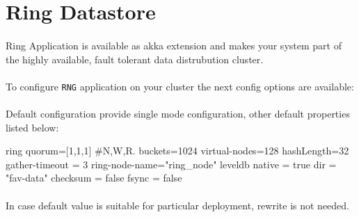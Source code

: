 \section{Ring Datastore}
\paragraph{}
Ring Application is available as akka extension and makes your system part of the highly available, fault tolerant data distrubution cluster.

\paragraph{}
To configure \texttt{RNG} application on your cluster the next config options are available:

\paragraph{}
Default configuration provide single mode configuration, other default properties listed below:

\begin{json}
ring{
  quorum=[1,1,1]  #N,W,R.
  buckets=1024
  virtual-nodes=128
  hashLength=32
  gather-timeout = 3
  ring-node-name="ring_node"
  leveldb {
    native = true
    dir = "fav-data"
    checksum = false
    fsync = false
  }
}
\end{json}

\paragraph{}
In case default value is suitable for particular deployment, rewrite is not needed.

